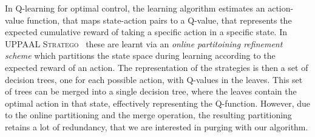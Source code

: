 In Q-learning for optimal control, the learning algorithm estimates an
action-value function, that maps state-action pairs to a Q-value, that
represents the expected cumulative reward of taking a specific action in a
specific state. In \textsc{UPPAAL Stratego}~\cite{Manfred2019} these are learnt
via an \textit{online partitoining refinement scheme} which partitions the state
space during learning according to the expected reward of an action. The
representation of the strategies is then a set of decision trees, one for each
possible action, with Q-values in the leaves. This set of trees can be merged
into a single decision tree, where the leaves contain the optimal action in that
state, effectively representing the Q-function. However, due to the online
partitioning and the merge operation, the resulting partitioning retains a lot
of redundancy, that we are interested in purging with our algorithm.

